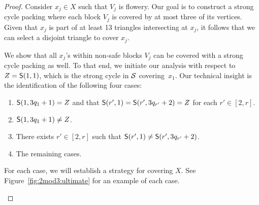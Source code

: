 \begin{proof}
  Consider $x_j \in X$ such that $V_{j}$ is flowery.
  Our goal is to construct a strong cycle packing where each block $V_{j}$ is covered by at most three of its vertices.
  Given that $x_j$ is part of at least 13 triangles intersecting at $x_j$, it follows that we can select a disjoint triangle to cover $x_j$.

  We show that all $x_j$'s within non-safe blocks $V_j$ can be covered with a strong cycle packing as well.
  To that end, we initiate our analysis with respect to $Z = \mathsf{S}(1, 1)$, which is the strong cycle in $\mathcal S$ covering~$x_1$.
  Our technical insight is the identification of the following four cases:
  \begin{enumerate}
    \item $\mathsf{S}(1, 3q_1 + 1) = Z$ and that $\mathsf{S}(r', 1) = \mathsf{S}(r', 3q_{r'} + 2) =  Z$ for each $r' \in [2, r]$. 
    \item $\mathsf{S}(1, 3q_1 + 1) \ne Z$.
    \item There exists $r' \in [2, r]$ such that $\mathsf{S}(r', 1) \ne \mathsf{S}(r', 3q_{r'} + 2)$.
    \item The remaining cases.
  \end{enumerate}
  For each case, we will establish a strategy for covering $X$.
  See Figure~\ref{fig:2mod3:ultimate} for an example of each case.

\begin{figure}
  \centering
\end{figure}
\end{proof}
